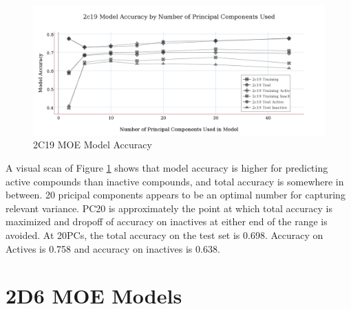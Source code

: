 \begin{figure}[H]
\includegraphics[width=1\textwidth]{../img/2c19_moe_model_accuracy.png}
\caption{2C19 MOE Model Accuracy}
\label{fig:2c19}
\end{figure}

A visual scan of Figure \ref{fig:2c19} shows that model accuracy is higher for predicting active compounds than inactive compounds, and total accuracy is somewhere in between. 20 pricipal components appears to be an optimal number for capturing relevant variance.
PC20 is approximately the point at which total accuracy is maximized and dropoff of accuracy on inactives at either end of the range is avoided.
At 20PCs, the total accuracy on the test set is 0.698. Accuracy on Actives is 0.758 and accuracy on inactives is 0.638.


\section{2D6 MOE Models}

